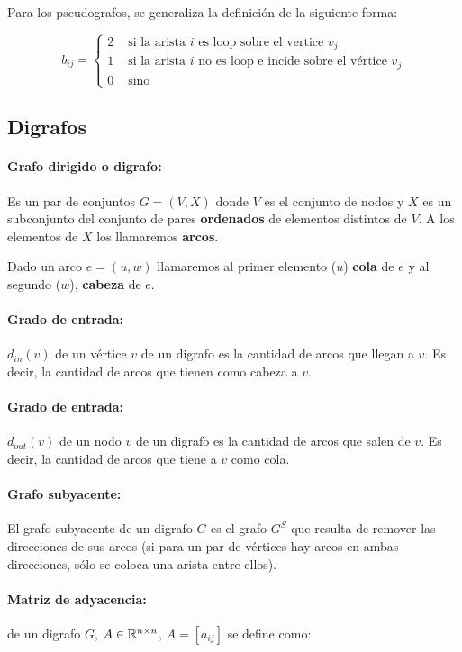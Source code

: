 Para los pseudografos, se generaliza la definición de la siguiente forma:

\[b_{ij} = \begin{cases}
2 & \text{ si la arista } i \text{ es loop sobre el vertice } v_j \\
1 & \text{ si la arista } i \text{ no es loop e incide sobre el vértice } v_j \\
0 & \text{ sino }
\end{cases}\]

\subsection{Digrafos}
\paragraph{Grafo dirigido o digrafo:} Es un par de conjuntos \(G = (V,X)\) donde \(V\) es el conjunto de nodos y \(X\) es un subconjunto del conjunto de pares \textbf{ordenados} de elementos distintos de \(V\). A los elementos de \(X\) los llamaremos \textbf{arcos}.

Dado un arco \(e=(u,w)\) llamaremos al primer elemento (\(u\)) \textbf{cola} de \(e\) y al segundo (\(w\)), \textbf{cabeza} de \(e\).

\paragraph{Grado de entrada:} \(d_{in}(v)\) de un vértice \(v\) de un digrafo es la cantidad de arcos que llegan a \(v\). Es decir, la cantidad de arcos que tienen como cabeza a \(v\).

\paragraph{Grado de entrada:} \(d_{out}(v)\) de un nodo \(v\) de un digrafo es la cantidad de arcos que salen de \(v\). Es decir, la cantidad de arcos que tiene a \(v\) como cola.

\paragraph{Grafo subyacente:} El grafo subyacente de un digrafo \(G\) es el grafo \(G^S\) que resulta de remover las direcciones de sus arcos (si para un par de vértices hay arcos en ambas direcciones, sólo se coloca una arista entre ellos).

\paragraph{Matriz de adyacencia:} de un digrafo \(G\), \(A\in\mathbb{R}^{n\times n}\), \(A = [a_{ij}]\) se define como:

